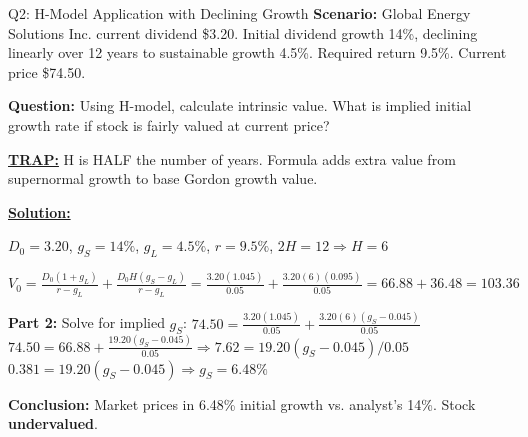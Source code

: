 \documentclass{beamer}
\renewcommand{\scriptsize}{\fontsize{6pt}{7pt}\selectfont}
\begin{document}
	\begin{frame}{Q2: H-Model Application with Declining Growth}
		\scriptsize
		\textbf{Scenario:} Global Energy Solutions Inc. current dividend \$3.20. Initial dividend growth 14\%, declining linearly over 12 years to sustainable growth 4.5\%. Required return 9.5\%. Current price \$74.50.
		
		\textbf{Question:} Using H-model, calculate intrinsic value. What is implied initial growth rate if stock is fairly valued at current price?
		
		\vspace{2pt}
		\underline{\textbf{TRAP:}} H is HALF the number of years. Formula adds extra value from supernormal growth to base Gordon growth value.
		
		\vspace{4pt}
		\underline{\textbf{Solution:}}
		
		$D_0 = 3.20$, $g_S = 14\%$, $g_L = 4.5\%$, $r = 9.5\%$, $2H = 12 \Rightarrow H = 6$
		
		$V_0 = \frac{D_0(1+g_L)}{r-g_L} + \frac{D_0H(g_S-g_L)}{r-g_L} = \frac{3.20(1.045)}{0.05} + \frac{3.20(6)(0.095)}{0.05} = 66.88 + 36.48 = 103.36$
		
		\vspace{2pt}
		\textbf{Part 2:} Solve for implied $g_S$:
		$74.50 = \frac{3.20(1.045)}{0.05} + \frac{3.20(6)(g_S-0.045)}{0.05}$
		$74.50 = 66.88 + \frac{19.20(g_S-0.045)}{0.05} \Rightarrow 7.62 = 19.20(g_S-0.045)/0.05$
		$0.381 = 19.20(g_S-0.045) \Rightarrow g_S = 6.48\%$
		
		\textbf{Conclusion:} Market prices in 6.48\% initial growth vs. analyst's 14\%. Stock \textbf{undervalued}.
	\end{frame}
	
\end{document}
